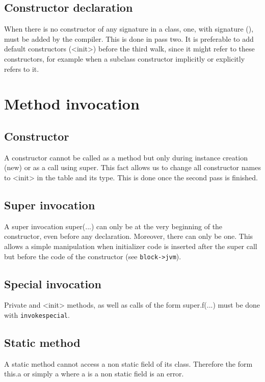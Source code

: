 \documentclass{book}
\newcommand{\func}[1]{\verb+#1+}
\newcommand{\jinst}[1]{\verb+#1+}
\begin{document}
\subsection{Constructor declaration}

When there is no constructor of any signature in a class, one, with
signature (), must be added by the compiler. This is done in pass
two. It is preferable to add default constructors (<init>) before the
third walk, since it might refer to these constructors, for example
when a subclass constructor implicitly or explicitly refers to it.

\section{Method invocation}

\subsection{Constructor}

A constructor cannot be called as a method but only during instance
creation (new) or as a call using super. This fact allows us to change
all constructor names to <init> in the table and its type. This is
done once the second pass is finished.

\subsection{Super invocation}

A super invocation super(...) can only be at the very beginning of the
constructor, even before any declaration. Moreover, there can only be
one. This allows a simple manipulation when initializer code is
inserted after the super call but before the code of the constructor
(see \func{block->jvm}).

\subsection{Special invocation}

Private and <init> methods, as well as calls of the form super.f(...)
must be done with \jinst{invokespecial}.

\subsection{Static method}

A static method cannot access a non static field of its class.
Therefore the form this.a or simply a where a is a non static field is
an error. 
\end{document}
